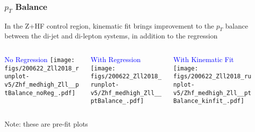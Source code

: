 \documentclass{beamer}
\begin{document}
\begin{frame}
  \frametitle{$p_T$ Balance}

  In the Z+HF control region, kinematic fit brings improvement to the $p_T$ balance
  between the di-jet and di-lepton systems,
  in addition to the regression
  \vfill

  \begin{columns}
    \begin{column}{0.33\linewidth}
      \centering
      \textcolor{blue}{No Regression}
      \texttt{[image: figs/200622\_Zll2018\_runplot-v5/Zhf\_medhigh\_Zll\_\_ptBalance\_noReg\_.pdf]}
    \end{column}
    \begin{column}{0.34\linewidth}
      \centering
      \textcolor{blue}{With Regression}
      \texttt{[image: figs/200622\_Zll2018\_runplot-v5/Zhf\_medhigh\_Zll\_\_ptBalance\_.pdf]}
    \end{column}
    \begin{column}{0.33\linewidth}
      \centering
      \textcolor{blue}{With Kinematic Fit}
      \texttt{[image: figs/200622\_Zll2018\_runplot-v5/Zhf\_medhigh\_Zll\_\_ptBalance\_kinfit\_.pdf]}
    \end{column}
  \end{columns}

  Note: these are pre-fit plots

\end{frame}
\end{document}
